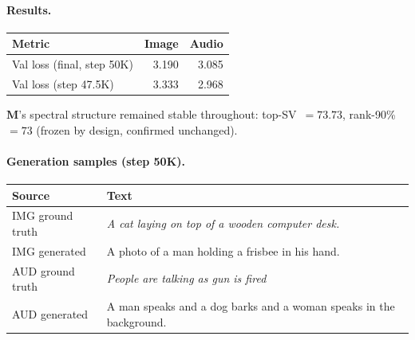 \documentclass[11pt, a4paper]{article}
\newcommand{\M}{\mathbf{M}}
\theoremstyle{plain}
\theoremstyle{remark}
\begin{document}
\paragraph{Results.}

\begin{center}\small
\begin{tabular}{@{}lrr@{}}
\toprule
\textbf{Metric} & \textbf{Image} & \textbf{Audio} \\
\midrule
Val loss (final, step 50K) & 3.190 & 3.085 \\
Val loss (step 47.5K) & 3.333 & 2.968 \\
\bottomrule
\end{tabular}
\end{center}

$\M$'s spectral structure remained stable throughout: top-SV~$= 73.73$, rank-90\%~$= 73$ (frozen by design, confirmed unchanged).

\paragraph{Generation samples (step 50K).}

\begin{center}\small
\begin{tabular}{@{}lp{9cm}@{}}
\toprule
\textbf{Source} & \textbf{Text} \\
\midrule
IMG ground truth & \textit{A cat laying on top of a wooden computer desk.} \\
IMG generated & A photo of a man holding a frisbee in his hand. \\
\midrule
AUD ground truth & \textit{People are talking as gun is fired} \\
AUD generated & A man speaks and a dog barks and a woman speaks in the background. \\
\bottomrule
\end{tabular}
\end{center}
\end{document}
